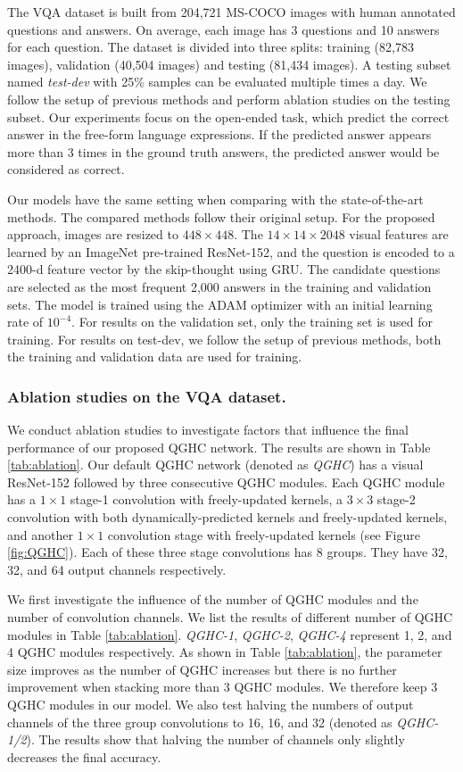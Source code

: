 \documentclass[runningheads]{llncs}
\begin{document}
The VQA dataset is built from 204,721 MS-COCO images with human annotated questions and answers. On average, each image has 3 questions and 10 answers for each question. The dataset is divided into three splits: training (82,783 images), validation (40,504 images) and testing (81,434 images).
A testing subset named \emph{test-dev} with 25\% samples can be evaluated multiple times a day. We follow the setup of previous methods and perform ablation studies on the testing subset.
Our experiments focus on the open-ended task, which predict the correct answer in the free-form language expressions.
If the predicted answer appears more than 3 times in the ground truth answers, the predicted answer would be considered as correct. 

Our models have the same setting when comparing with the state-of-the-art methods. The compared methods follow their original setup. For the proposed approach, images are resized to $448 \times 448$. The $14 \times 14 \times 2048$ visual features are learned by an ImageNet pre-trained ResNet-152, and the question is encoded to a 2400-d feature vector by the skip-thought \cite{kiros2015skip} using GRU. The candidate questions are selected as the most frequent 2,000 answers in the training and validation sets. The model is trained using the ADAM optimizer with an initial learning rate of $10^{-4}$. For results on the validation set, only the training set is used for training. For results on test-dev, we follow the setup of previous methods, both the training and validation data are used for training.

\subsubsection{Ablation studies on the VQA dataset.}
\label{sssec:ablation_vqa}
We conduct ablation studies to investigate factors that influence the final performance of our proposed QGHC network. The results are shown in Table \ref{tab:ablation}.
Our default QGHC network (denoted as \emph{QGHC}) has a visual ResNet-152 followed by three consecutive QGHC modules. Each QGHC module has a $1\times 1$ stage-1 convolution with freely-updated kernels, a $3\times 3$ stage-2 convolution with both dynamically-predicted kernels and freely-updated kernels, and another $1\times 1$ convolution stage with freely-updated kernels (see Figure \ref{fig:QGHC}). Each of these three stage convolutions has 8 groups. They have 32, 32, and 64 output channels respectively.

We first investigate the influence of the number of QGHC modules and the number of convolution channels. We list the results of different number of QGHC modules in Table \ref{tab:ablation}. \textit{QGHC-1}, \textit{QGHC-2}, \textit{QGHC-4} represent 1, 2, and 4 QGHC modules respectively. As shown in Table \ref{tab:ablation}, the parameter size improves as the number of QGHC increases but there is no further improvement when stacking more than 3 QGHC modules. We therefore keep 3 QGHC modules in our model.
We also test halving the numbers of output channels of the three group convolutions to 16, 16, and 32 (denoted as \emph{QGHC-1/2}). The results show that halving the number of channels only slightly decreases the final accuracy.
\end{document}
